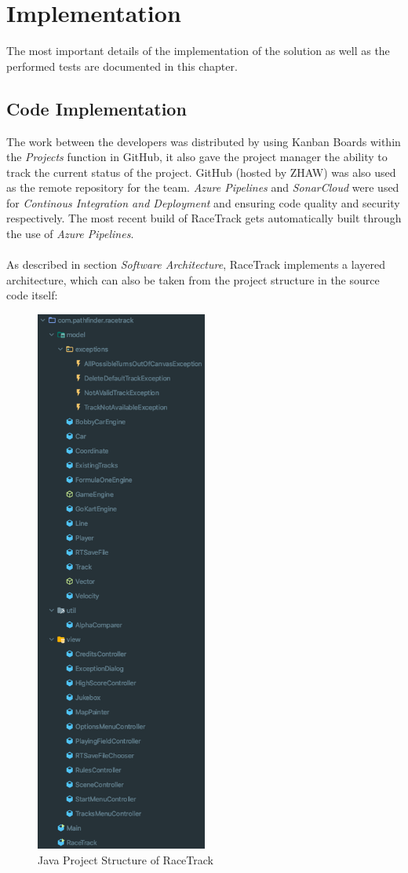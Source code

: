 \chapter{Implementation}
	The most important details of the implementation of the solution as well as the performed tests are documented in this chapter.

	\section{Code Implementation}
		The work between the developers was distributed by using \gls{Kanban} Boards within the \textit{Projects} function in GitHub, it also gave the project manager the ability to track the current status of the project. GitHub (hosted by ZHAW) was also used as the remote repository for the team. \textit{\gls{Azure Pipelines}} and \textit{\gls{SonarCloud}} were used for \textit{\gls{Continous Integration and Deployment}} and ensuring code quality and security respectively. The most recent build of RaceTrack gets automatically built through the use of \textit{Azure Pipelines}.
		\\~\\

		As described in section \textit{Software Architecture}, RaceTrack implements a layered architecture, which can also be taken from the project structure in the source code itself:
		\begin{figure}[H]
			\centering
			\includegraphics[height=18cm,keepaspectratio,center]{img/Implementation_Code_Package-Structure.png}
			\caption{Java Project Structure of RaceTrack}
		\end{figure}


